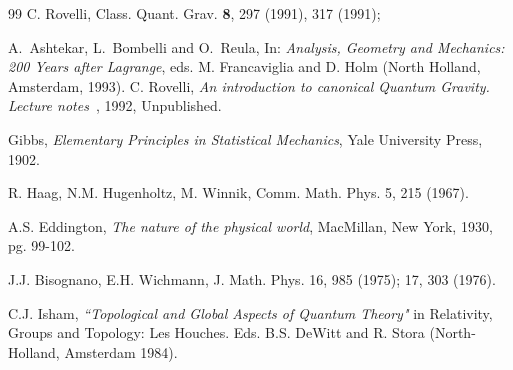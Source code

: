 \begin{thebibliography}{99}
C. Rovelli, Class. Quant. Grav. {\bf 8}, 297 (1991), 317 (1991);

A.~Ashtekar, L.~Bombelli and O.~Reula, In: {\it Analysis, Geometry
and Mechanics: 200 Years after Lagrange}, eds. M. Francaviglia and
D. Holm (North Holland, Amsterdam, 1993).  C. Rovelli, {\it An
introduction to canonical Quantum Gravity. Lecture notes\ },
1992, Unpublished.

Gibbs, {\it Elementary Principles in Statistical Mechanics}, Yale
University Press, 1902.

R. Haag, N.M. Hugenholtz, M. Winnik, Comm. Math. Phys. 5, 215
(1967).

A.S. Eddington, {\it The nature of the physical world}, MacMillan,
New York, 1930, pg. 99-102.

 J.J. Bisognano, E.H. Wichmann, J. Math. Phys.
16, 985 (1975); 17, 303 (1976).

\end{thebibliography}


C.J. Isham, {\em ``Topological and Global Aspects of Quantum
Theory"} in Relativity, Groups and Topology: Les Houches. Eds. B.S.
DeWitt and R. Stora (North-Holland, Amsterdam 1984).

